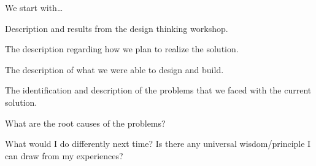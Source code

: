 \iteration
We start with… 

\DesignThinking
Description and results from the design thinking workshop. 

\plan
The description regarding how we plan to realize the solution. 

\results 
The description of what we were able to design and build. 

\problems
The identification and description of the problems that we faced with the current solution. 

\diagnosis
What are the root causes of the problems? 

\principles
What would I do differently next time? Is there any universal wisdom/principle I can draw from my experiences? 